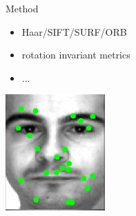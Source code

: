 \begin{xpsectionbox}{}{}


\begin{minipage}{0.5\linewidth}
Method
\begin{itemize}
	  \item Haar/SIFT/SURF/ORB
	  \item rotation invariant metrics
	  \item ...
\end{itemize}
\begin{center}
			\includegraphics[height=0.25\linewidth]{images/face_sift}
\end{center}



\end{minipage}
\end{xpsectionbox}
